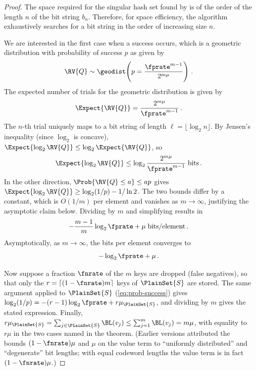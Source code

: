\documentclass[ ../main.tex]{subfiles}
\begin{document}
\begin{proof}
The space required for the singular hash set found by  is of the order of the length $n$ of the bit string $b_n$.
Therefore, for space efficiency, the algorithm exhaustively searches for a bit string in the order of increasing size $n$.

We are interested in the first case when a success occurs, which is a geometric distribution with probability of success $p$ as given by
\begin{equation}
    \RV{Q} \sim \geodist\!\left(p = \frac{\fprate^{m-1}}{2^{m \mu}}\right)\,.
\end{equation}
The expected number of trials for the geometric distribution is given by
\begin{equation}
\label{eq:exp_trials}
    \Expect{\RV{Q}} = \frac{2^{m \mu}}{\fprate^{m-1}}\,.
\end{equation}
The $n$-th trial uniquely maps to a bit string of length $\ell = \lfloor \log_2 n \rfloor$.
By Jensen's inequality (since $\log_2$ is concave),
$\Expect{\log_2 \RV{Q}} \leq \log_2 \Expect{\RV{Q}}$, so
\begin{equation}
    \Expect{\log_2 \RV{Q}} \leq \log_2 \frac{2^{m \mu}}{\fprate^{m-1}}\; \si{bits}\,.
\end{equation}
In the other direction, $\Prob{\RV{Q} \leq a} \leq a p$ gives
$\Expect{\log_2 \RV{Q}} \geq \log_2(1/p) - 1/\ln 2$.
The two bounds differ by a constant, which is $O(1/m)$ per element and
vanishes as $m \to \infty$, justifying the asymptotic claim below.
Dividing by $m$ and simplifying results in
\begin{equation}
    -\frac{m-1}{m} \log_2 \fprate + \mu\; \si{bits \per element}\,.
\end{equation}
Asymptotically, as $m \to \infty$, the bits per element converges to
\begin{equation}
\label{eq:shm-zero-fnr}
    -\log_2 \fprate + \mu\,.
\end{equation}

Now suppose a fraction $\fnrate$ of the $m$ keys are dropped (false negatives), so that only the $r = \lceil(1-\fnrate)m\rceil$ keys of $\PlainSet{S}$ are stored.
The same argument applied to $\PlainSet{S}$ (\cref{eq:prob-success}) gives $\log_2(1/p) = -(r-1)\log_2 \fprate + r\mu_{\PlainSet{S}}$, and dividing by $m$ gives the stated expression.
Finally, $r\mu_{\PlainSet{S}} = \sum_{j \in \PlainSet{S}} \BL(v_j) \leq \sum_{j=1}^m \BL(v_j) = m\mu$, with equality to $r\mu$ in the two cases named in the theorem.
(Earlier versions attributed the bounds $(1-\fnrate)\mu$ and $\mu$ on the value term to ``uniformly distributed'' and ``degenerate'' bit lengths; with equal codeword lengths the value term is in fact $(1-\fnrate)\mu$.)
\end{proof}
\end{document}
